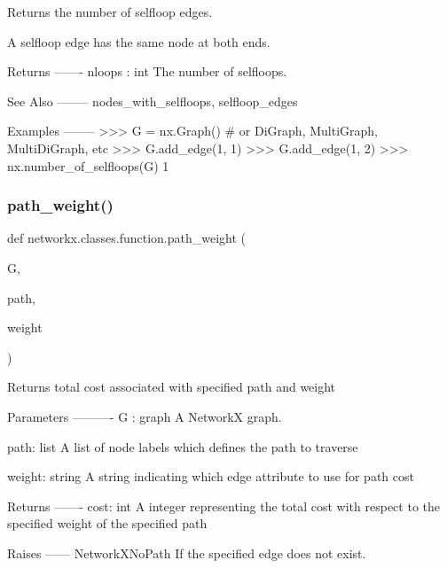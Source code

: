 \begin{DoxyVerb}Returns the number of selfloop edges.

A selfloop edge has the same node at both ends.

Returns
-------
nloops : int
    The number of selfloops.

See Also
--------
nodes_with_selfloops, selfloop_edges

Examples
--------
>>> G = nx.Graph()  # or DiGraph, MultiGraph, MultiDiGraph, etc
>>> G.add_edge(1, 1)
>>> G.add_edge(1, 2)
>>> nx.number_of_selfloops(G)
1
\end{DoxyVerb}
 \mbox{\label{namespacenetworkx_1_1classes_1_1function_a27237953342bdad7ef82830af11008f7}} 
\subsubsection{\texorpdfstring{path\+\_\+weight()}{path\_weight()}}
{\footnotesize\ttfamily def networkx.\+classes.\+function.\+path\+\_\+weight (\begin{DoxyParamCaption}\item[{}]{G,  }\item[{}]{path,  }\item[{}]{weight }\end{DoxyParamCaption})}

\begin{DoxyVerb}Returns total cost associated with specified path and weight

Parameters
----------
G : graph
    A NetworkX graph.

path: list
    A list of node labels which defines the path to traverse

weight: string
    A string indicating which edge attribute to use for path cost

Returns
-------
cost: int
    A integer representing the total cost with respect to the
    specified weight of the specified path

Raises
------
NetworkXNoPath
    If the specified edge does not exist.
\end{DoxyVerb}
 \mbox{\label{namespacenetworkx_1_1classes_1_1function_a9cfec12fd521d462be920924dd5953f4}} 
